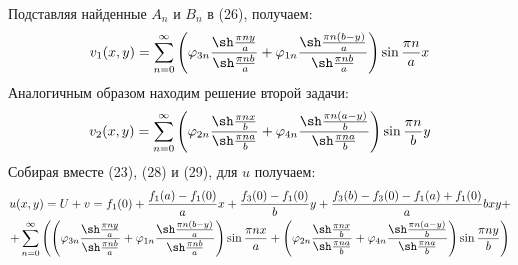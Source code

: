 \documentclass[11pt]{article}
\begin{document}
Подставляя найденные $A_n$ и $B_n$ в (26), получаем:
\begin{equation}
v_1(x, y) = \sum_{n = 0}^{\infty}\left(\varphi_{3n}\frac{\sh\frac{\pi ny}a}{\sh\frac{\pi nb}a} + \varphi_{1n}\frac{\sh\frac{\pi n(b - y)}a}{\sh\frac{\pi nb}a}\right)\sin\frac{\pi n}ax
\end{equation}
Аналогичным образом находим решение второй задачи:
\begin{equation}
v_2(x, y) = \sum_{n = 0}^{\infty}\left(\varphi_{2n}\frac{\sh\frac{\pi nx}b}{\sh\frac{\pi na}b} + \varphi_{4n}\frac{\sh\frac{\pi n(a - y)}b}{\sh\frac{\pi na}b}\right)\sin\frac{\pi n}by
\end{equation}
Собирая вместе (23), (28) и (29), для $u$ получаем:
\begin{multline}
u(x, y) = U + v = f_1(0) + \frac{f_1(a) - f_1(0)}ax + \frac{f_3(0) - f_1(0)}by + \frac{f_3(b) - f_3(0) - f_1(a) + f_1(0)}abxy + \\
+ \sum_{n = 0}^{\infty}\left(\left(\varphi_{3n}\frac{\sh\frac{\pi ny}a}{\sh\frac{\pi nb}a} + \varphi_{1n}\frac{\sh\frac{\pi n(b - y)}a}{\sh\frac{\pi nb}a}\right)\sin\frac{\pi nx}a +
\left(\varphi_{2n}\frac{\sh\frac{\pi nx}b}{\sh\frac{\pi na}b} + \varphi_{4n}\frac{\sh\frac{\pi n(a - y)}b}{\sh\frac{\pi na}b}\right)\sin\frac{\pi ny}b\right)
\end{multline}
\end{document}
